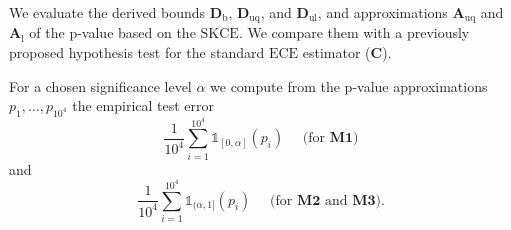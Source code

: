 \documentclass[10pt]{article}
\newcommand*{\ECE}{\mathup{ECE}}
\newcommand*{\squaredkernelmeasure}{\mathup{SKCE}}
\begin{document}
\begin{tcbposter}
{    

    \begin{minipage}[t]{0.4\linewidth}
      \vspace*{0pt}
      We evaluate the derived bounds $\symbf{D}_{\mathup{b}}$,
      $\symbf{D}_{\mathup{uq}}$, and $\symbf{D}_{\mathup{ul}}$, and
      approximations $\symbf{A}_{\mathup{uq}}$ and
      $\symbf{A}_{\mathup{l}}$ of the p-value based on the
      $\squaredkernelmeasure$. We compare them with a previously
      proposed hypothesis test for the standard $\ECE$ estimator
      ($\symbf{C}$).

      \vspace{\baselineskip}

      For a chosen significance level $\alpha$ we compute from the
      p-value approximations $p_1,\ldots,p_{10^4}$ the empirical test
      error
      \begin{equation*}
        \frac{1}{10^4} \sum_{i=1}^{10^4} \mathbb{1}_{[0, \alpha]}(p_i) \quad \text{ (for } \symbf{M1} \text{)}
      \end{equation*}
      and
      \begin{equation*}
        \frac{1}{10^4} \sum_{i=1}^{10^4} \mathbb{1}_{(\alpha, 1]}(p_i) \quad \text{ (for } \symbf{M2} \text{ and } \symbf{M3} \text{)}.
      \end{equation*}
    \end{minipage}%
    \begin{minipage}[t]{0.6\linewidth}
      \vspace*{0pt}
      \begin{center}
        
      \end{center}
    \end{minipage}
  }
\end{tcbposter}
\end{document}
